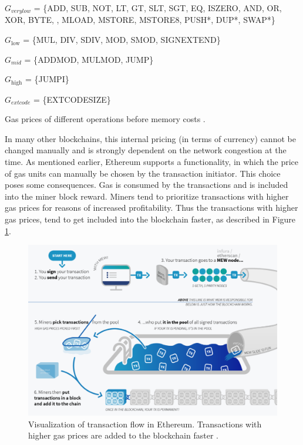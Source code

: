\begin{table}[H]
$G_{verylow}$ = \{{\small ADD}, {\small SUB}, {\small NOT}, {\small LT}, {\small GT}, {\small SLT}, {\small SGT}, {\small EQ}, {\small ISZERO}, {\small AND}, {\small OR}, {\small XOR}, {\small BYTE}, \newline \noindent\hspace*{2cm}{\small CALLDATALOAD}, {\small MLOAD}, {\small MSTORE}, {\small MSTORE8}, {\small PUSH*}, {\small DUP*}, {\small SWAP*}\}

$G_{\mathrm{low}}$ = \{{\small MUL}, {\small DIV}, {\small SDIV}, {\small MOD}, {\small SMOD}, {\small SIGNEXTEND}\}

$G_{mid}$ = \{{\small ADDMOD}, {\small MULMOD}, {\small JUMP}\}

$G_{\mathrm{high}}$ = \{{\small JUMPI}\}

$G_{extcode}$ = \{{\small EXTCODESIZE}\}

\caption{Gas prices of different operations before memory costs \textnormal{\citep{ethyellow}}.}
\label{tab:gas}
\end{table}

In many other blockchains, this internal pricing (in terms of currency) cannot be changed manually and is strongly dependent on the network congestion at the time. As mentioned earlier, Ethereum supports a functionality, in which the price of gas units can manually be chosen by the transaction initiator. This choice poses some consequences. Gas is consumed by the transactions and is included into the miner block reward. Miners tend to prioritize transactions with higher gas prices for reasons of increased profitability. Thus the transactions with higher gas prices, tend to get included into the blockchain faster, as described in Figure \ref{fig:ethtx}.

\begin{figure}[H]
\centering
\includegraphics[scale=0.67]{images/ethprincipal.png}
\caption{Visualization of transaction flow in Ethereum. Transactions with higher gas prices are added to the blockchain faster \textnormal{\citep{ethtxpic}}.}
\label{fig:ethtx}
\end{figure}

